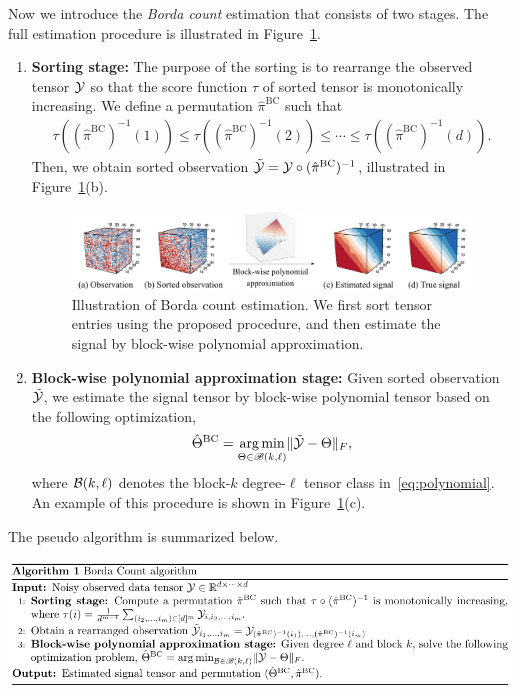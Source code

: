 \documentclass[11pt]{article}
\theoremstyle{definition}
\def\caliB{\mathscr{B}}
\begin{document}
Now we introduce the \emph{Borda count} estimation that consists of two stages. The full estimation procedure is illustrated in Figure~\ref{fig:borda}.
\begin{enumerate}[wide, labelwidth=0pt, labelindent=0pt]
  \item {\bf Sorting stage:} The purpose of the sorting is to rearrange the observed tensor $\mathcal{Y}$ so that the score function $\tau$ of sorted tensor is  monotonically increasing. We define a permutation $\hat\pi^{\text{BC}}$ such that
    \begin{align}\label{eq:permute}
        \tau((\hat\pi^{\text{BC}})^{-1}(1))\leq  \tau((\hat\pi^{\text{BC}})^{-1}(2))
        \leq \cdots 
        \leq
        \tau((\hat\pi^{\text{BC}})^{-1}(d)).
    \end{align}
    Then, we obtain sorted observation $\tilde{\mathcal{Y}} = \mathcal{Y} \circ (\hat\pi^{\text{BC}})^{-1}$, illustrated in Figure~\ref{fig:borda}(b).
\begin{figure}[t]
    \centering
    \includegraphics[width = \textwidth]{figure/Borda2.pdf}
    \caption{Illustration of Borda count estimation. We first sort tensor entries using the proposed procedure, and then estimate the signal by block-wise polynomial approximation.}
    \label{fig:borda}
\end{figure}

 \item {\bf Block-wise polynomial approximation stage:} Given sorted observation $\tilde {\mathcal{Y}} $, we estimate the signal tensor by block-wise polynomial tensor based on the following optimization,
    \begin{align}\label{eq:bclse}
        \hat\Theta^{\text{BC}} = \argmin_{\Theta\in\caliB(k,\ell)}\FnormSize{}{\tilde\tY-\Theta},
    \end{align}
    where $\mathcal{B}(k,\ell)$ denotes the block-$k$ degree-$\ell$ tensor class  in~\eqref{eq:polynomial}. An example of this procedure is shown in Figure~\ref{fig:borda}(c).    
    \end{enumerate}
    
The pseudo algorithm is summarized below.
\begin{center}
\includegraphics[width=1\textwidth]{figure/algorithm_template.pdf}
\end{center}
\end{document}

